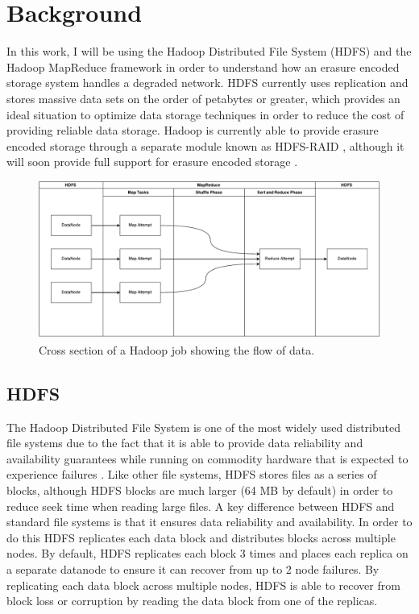 \documentclass{ucetd}
\begin{document}

\chapter{Background}
\label{ch:backgroud}

In this work, I will be using the Hadoop Distributed File System (HDFS) and the
Hadoop MapReduce framework in order to understand how an erasure encoded storage
system handles a degraded network. HDFS currently uses replication and
stores massive data sets on the order of petabytes or greater, which provides an
ideal situation to optimize data storage techniques in order to reduce the
cost of providing reliable data storage. Hadoop \cite{Hadoop} is currently able to
provide erasure encoded storage through a separate module known as HDFS-RAID
\cite{HDFS-Raid}, although it will soon provide full support for erasure encoded
storage \cite{HDFS-EC:Design}.

\begin{figure}
    \centering
    \includegraphics[width=\linewidth]{diagrams/HadoopJobCrossSection.pdf}
    \caption[Hadoop Job Cross Section]{Cross section of a Hadoop job
        showing the flow of data.}
    \label{crossSect}
\end{figure}


\section{HDFS}

The Hadoop Distributed File System is one of the most widely used distributed
file systems due to the fact that it is able to provide data reliability and
availability guarantees while running on commodity hardware that is expected to
experience failures \cite{HDFS-Arch}. Like other file systems, HDFS stores files
as a series of blocks, although HDFS blocks are much larger (64 MB by default)
in order to reduce seek time when reading large files. A key difference between
HDFS and standard file systems is that it ensures data reliability and
availability.  In order to do this HDFS replicates each data block and
distributes blocks across multiple nodes.  By default, HDFS replicates each
block 3 times and places each replica on a separate datanode to ensure it can
recover from up to 2 node failures. By replicating each data block across
multiple nodes, HDFS is able to recover from block loss or corruption by reading
the data block from one of the replicas.
\end{document}
